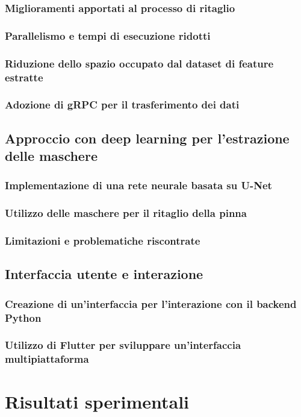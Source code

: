 \documentclass[a4paper,12pt]{report}
\begin{document}
\subsection{Miglioramenti apportati al processo di ritaglio}
\subsection{Parallelismo e tempi di esecuzione ridotti}
\subsection{Riduzione dello spazio occupato dal dataset di feature estratte}
\subsection{Adozione di gRPC per il trasferimento dei dati}
\section{Approccio con deep learning per l'estrazione delle maschere}
\subsection{Implementazione di una rete neurale basata su U-Net}
\subsection{Utilizzo delle maschere per il ritaglio della pinna}
\subsection{Limitazioni e problematiche riscontrate}
\section{Interfaccia utente e interazione}
\subsection{Creazione di un'interfaccia per l'interazione con il backend Python}
\subsection{Utilizzo di Flutter per sviluppare un'interfaccia multipiattaforma}

\chapter{Risultati sperimentali}
\end{document}
